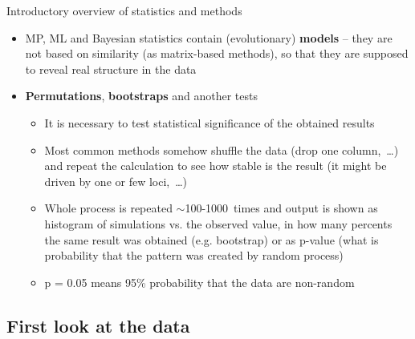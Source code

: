 \documentclass[compress, ucs, xelatex, 11pt, xcolor=svgnames,
  hyperref={
    bookmarks=true,
    unicode=true,
    colorlinks=true,
    pdftitle={Molecular data in R},
    plainpages=false,
    pdfauthor={Vojtech Zeisek},
    pdfsubject={Course about phylogeny and evolution in R},
    pdfcreator={XeLaTeX},
    pdfkeywords={R, evolution, phylogeny, molecular data},
    linkcolor=Tomato,
    anchorcolor=SaddleBrown,
    citecolor=Goldenrod,
    filecolor=DarkMagenta,
    menucolor=Sienna,
    urlcolor=DarkTurquoise,
    pdftex},
  url={hyphens, lowtilde} %
  ]{beamer}
\begin{document}
\begin{frame}[allowframebreaks]{Introductory overview of statistics and methods}
\begin{itemize}
\begin{itemize}
      \begin{itemize}
	\item After some time it converges to find optimal solution (usually described by logarithms of likelihood of given model)
	\item Usually, $\sim$millions (or even more) of generations are required
	\item Beginning use to be very unstable -- it is discarded as burn-in (``heating'' of Markov Chain Monte Carlo (MCMC) doing the exploration and optimization of models), usually $\sim$10-25\%~of steps
      \end{itemize}
    \end{itemize}
    \item MP, ML and Bayesian statistics contain (evolutionary) \textbf{models} -- they are not based on similarity (as matrix-based methods), so that they are supposed to reveal real structure in the data
    \item \textbf{Permutations}, \textbf{bootstraps} and another tests
    \begin{itemize}
      \item It is necessary to test statistical significance of the obtained results
      \item Most common methods somehow shuffle the data (drop one column,~\ldots) and repeat the calculation to see how stable is the result (it might be driven by one or few loci,~\ldots)
      \item Whole process is repeated $\sim$100-1000~times and output is shown as histogram of simulations vs. the observed value, in how many percents the same result was obtained (e.g. bootstrap) or as p-value (what is probability that the pattern was created by random process)
      \item p = 0.05 means 95\% probability that the data are non-random
    \end{itemize}
  \end{itemize}
\end{frame}
  
\subsection{First look at the data}
\end{document}

